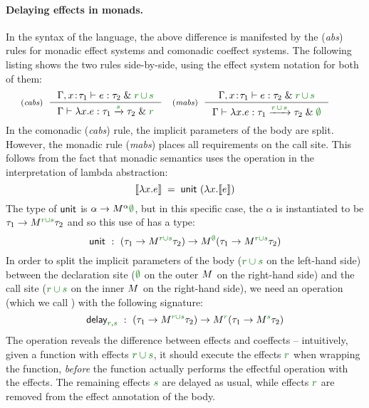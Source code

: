 \paragraph{Delaying effects in monads.} 
In the syntax of the language, the above difference is manifested by the (\emph{abs}) rules for 
monadic effect systems and comonadic coeffect systems. The following listing shows the two rules 
side-by-side, using the effect system notation for both of them:
%
\begin{equation*}
\tyrule{cabs}
  { \Gamma, x\!:\!\tau_1 \vdash e : \tau_2 \;\&\; \cclrd{r}\,\cclrd{\cup}\,\cclrd{s} }
  { \Gamma \vdash \lambda x.e : \tau_1 \xrightarrow{\cclrd{s}} \tau_2 \;\&\; \cclrd{r}}
\quad
\tyrule{mabs}
  { \Gamma, x\!:\!\tau_1 \vdash e : \tau_2 \;\&\; \cclrd{r}\,\cclrd{\cup}\,\cclrd{s}}
  { \Gamma \vdash \lambda x.e : \tau_1 \xrightarrow{\cclrd{r}\,\cclrd{\cup}\,\cclrd{s}} \tau_2 \;\&\; \cclrd{\emptyset} }
\qquad
\end{equation*}
%
In the comonadic (\emph{cabs}) rule, the implicit parameters of the body are split. However,
the monadic rule (\emph{mabs}) places all requirements on the call site. This follows from the
fact that monadic semantics uses the  operation in the interpretation of lambda abstraction:
%
\begin{equation*}
\sem{\lambda x.e} \;=\; \ident{unit}~(\lambda x. \sem{e})
\end{equation*}
%
The type of $\textnormal{\sffamily unit}$ is $\alpha\rightarrow\mtyp{\alpha}{\cclrd{\emptyset}}$, but in this specific
case, the $\alpha$ is instantiated to be $\tau_1\rightarrow\mtyp{\cclrd{r \cup s}}{\tau_2}$ and so this
use of  has a type:
%
\begin{equation*}
\ident{unit}~:~(\tau_1\rightarrow\mtyp{\cclrd{r \cup s}}{\tau_2}) \rightarrow \mtyp{\cclrd{\emptyset}}(\tau_1\rightarrow\mtyp{\cclrd{r \cup s}}{\tau_2})
\end{equation*}
%
In order to split the implicit parameters of the body ($\cclrd{r \cup s}$ on the left-hand side) between 
the declaration site ($\cclrd{\emptyset}$ on the outer $\mtyp{}$ on the right-hand side) and the 
call site ($\cclrd{r \cup s}$ on the inner $\mtyp{}$ on the right-hand side), we need an operation
(which we call ) with the following signature:
%
\begin{equation*}
\ident{delay}_{\cclrd{r}, \cclrd{s}}~:~(\tau_1\rightarrow\mtyp{\cclrd{r \cup s}}{\tau_2}) \rightarrow \mtyp{\cclrd{r}}(\tau_1\rightarrow\mtyp{\cclrd{s}}{\tau_2})
\end{equation*}
%
The operation reveals the difference between effects and coeffects -- intuitively, given a function
with effects $\cclrd{r \cup s}$, it should execute the effects $\cclrd{r}$ when wrapping the 
function, \emph{before} the function actually performs the effectful operation with the effects.
The remaining effects $\cclrd{s}$ are delayed as usual, while effects $\cclrd{r}$ are removed
from the effect annotation of the body.

